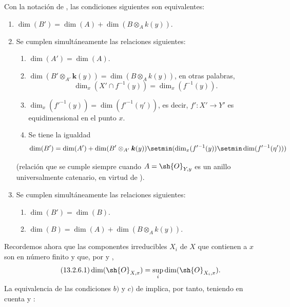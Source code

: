\begin{lemma}[13.2.5]
\label{IV.13.2.5}
Con la notación de , las condiciones siguientes son equivalentes:
\begin{enumerate}[label=\emph{\alph*)}]
  \item $\dim(B')=\dim(A)+\dim(B\otimes_A k(y))$.
  \item Se cumplen simultáneamente las relaciones siguientes:
  \begin{enumerate}[label=\textup{(\roman*)}]
    \item $\dim(A')=\dim(A)$.
    \item $\dim(B'\otimes_{A'}\boldsymbol k(y))=\dim(B\otimes_A k(y))$, en otras palabras,
    \[
      \dim_x(X'\cap f^{-1}(y))=\dim_x(f^{-1}(y)).
    \]
    \item $\dim_x(f'^{-1}(y))=\dim(f'^{-1}(\eta'))$, es decir, $f':X'\to Y'$ es equidimensional  en el punto $x$.
    \item Se tiene la igualdad
    \[
      \dim(B')=\dim(A')+\dim(B'\otimes_{A'}\boldsymbol k(y))\setmin(\dim_x(f'^{-1}(y))\setmin\dim(f'^{-1}(\eta')))
    \]
  \end{enumerate}
  (relación que se cumple siempre cuando $A=\sh{O}_{Y,y}$ es un anillo universalmente catenario, en virtud de ).
  \item Se cumplen simultáneamente las relaciones siguientes:
  \begin{enumerate}[label=\textup{(\roman*)}]
    \item $\dim(B')=\dim(B)$.
    \item $\dim(B)=\dim(A)+\dim(B\otimes_A k(y))$.
  \end{enumerate}
\end{enumerate}
\end{lemma}

\begin{env}[13.2.6]
\label{IV.13.2.6}
Recordemos ahora que las componentes irreducibles $X_i$ de $X$ que contienen a $x$ son en número finito y que, por  y ,
\[
\label{IV.13.2.6.1}
\tag{13.2.6.1}
  \dim(\sh{O}_{X,x})=\sup_i\dim(\sh{O}_{X_i,x}).
\]
La equivalencia de las condiciones $b)$ y $c)$ de  implica, por tanto, teniendo en cuenta  y :
\end{env}

